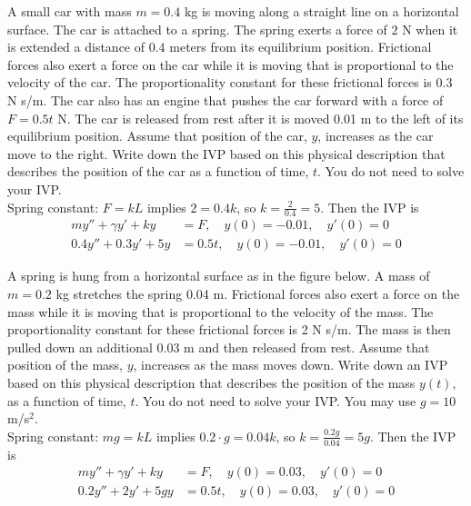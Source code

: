 \ifnum {}
\question[2] A small car with mass $m = 0.4$ kg is moving along a straight line on a horizontal surface. The car is attached to a spring. The spring exerts a force of $2$ N when it is extended a distance of $0.4$ meters from its equilibrium position. Frictional forces also exert a force on the car while it is moving that is proportional to the velocity of the car. The proportionality constant for these frictional forces is $0.3$ N s/m. The car also has an engine that pushes the car forward with a force of $F = 0.5t$ N. The car is released from rest after it is moved 0.01 m to the left of its equilibrium position. Assume that position of the car, $y$, increases as the car move to the right. Write down the IVP based on this physical description that describes the position of the car as a function of time, $t$. You do not need to solve your IVP. \\


\ifnum {} {\color{DarkBlue} 
Spring constant: $F = kL$ implies $2 = 0.4k$, so $k = \frac{2}{0.4} = 5$. Then the IVP is
\begin{align}
    my'' + \gamma y' + ky &= F, \quad y(0) = -0.01, \quad y'(0) = 0 \\
    0.4y'' + 0.3 y' + 5y &= 0.5t, \quad y(0) = -0.01, \quad y'(0) = 0 
\end{align}
} 
\else 
\fi
\fi 




\ifnum {}
\question[2] A spring is hung from a horizontal surface as in the figure below. A mass of $m=0.2$ kg stretches the spring 0.04 m. Frictional forces also exert a force on the mass while it is moving that is proportional to the velocity of the mass. The proportionality constant for these frictional forces is 2 N s/m. The mass is then pulled down an additional 0.03 m and then released from rest. Assume that position of the mass, $y$, increases as the mass moves down. Write down an IVP based on this physical description that describes the position of the mass $y(t)$, as a function of time, $t$. You do not need to solve your IVP. You may use $g = 10$ m/s$^2$. \\[4pt]


\ifnum {} {\color{DarkBlue} 
Spring constant: $mg = kL$ implies $0.2 \cdot g = 0.04k$, so $k = \frac{0.2g}{0.04} = 5g$. Then the IVP is
\begin{align}
    my'' + \gamma y' + ky &= F, \quad y(0) = 0.03, \quad y'(0) = 0 \\
    0.2y'' + 2 y' + 5gy &= 0.5t, \quad y(0) = 0.03, \quad y'(0) = 0 
\end{align}
} 
\else \vspace{2cm}
\fi
\fi 




